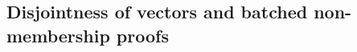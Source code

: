\documentclass[11pt, lettersize, notitlepage, leqno, footskip=0.6cm]{article}
\newcommand{\mc}{\mathcal}
\newcommand{\sub}{\subseteq}
\newcommand{\vs}{\vspace{-0.15cm}}
\newcommand{\noin}{\noindent}
\numberwithin{equation}{section}
\begin{document}
\begin{comment}

Let $A = g_1^{f(s)}$ be the commitment to a polynomial $f(X)$. This can be interpreted as a commitment to the vector $(v_0,\cdots,v_n)$ where $f(X) = \sum_{i=0}^n v_i X^i$.

Consider a setting where a Prover wants to show that the key-value pairs $(k_1,v_1),\cdots,(k_j, v_j)$ are a part of the committed vector. In other words, the Prover needs to show that the polynomial \vs $$f_0(X):= \sum_{i=1}^j c_j X^{k_j} $$ is ``a part of" the committed polynomial $f(X)$ in the sense that there is a subset $\mc{I}\sub [\deg(f)]$ such that the Hadamard product of $f(X)$
 and $\chi_{_{\mc{I}}}(X)$ is $f_0(X)$.


To this end, the Prover sends the commitment $$ A_0:= g_1^{f_0(s)}$$ to $f_0(X)$. He computes the set $\mc{I}:= \{k_1,\cdots,k_j \}$ and sends the commitment $${\tt{Com}}(\mc{I}):= g_1^{\chi_{_{\mc{I}}}(s)}. $$ The Prover uses the protocol $(\hyperlink{Binary}{\tt{ZKPoBinary}})$ to show that ${\tt{Com}}(\mc{I})$ is a commitment to some binary polynomial. He then uses the protocol $(\hyperlink{HadProd}{\tt{ZKPoHadProd}})$ to show that the polynomials committed in $A$ and ${\tt{Com}}(\mc{I})$ have Hadamard product that coincides with the polynomial committed in $A_0$.


This proof is constant-sized and is publicly verifiable against the commitments to $f(X)$ and $f_0(X)$. The Verifier does not need to store the entire committed polynomial $f(X)$ or the key-value pairs $(k_1,v_1),\cdots,(k_j, v_j)$ in order to verify the proof.



 Later, we will discuss a protocol ($\hyperlink{NumZeroCoeff}{\tt{ZKNumNZCoef}}$) that links the commitment to the polynomial $f_0(X)$ to the a commitment to the size of the set of key-value pairs represented by $f_0(X)$. This boils down to linking the following:\vspace{2mm}

\noin - a commitment to a polynomial \vspace{1mm}

\noin - a commitment to the number of non-zero coefficients of this polynomial. \end{comment}

\subsection{\fontsize{11}{11}\selectfont Disjointness of vectors and batched non-membership proofs}
\end{document}
